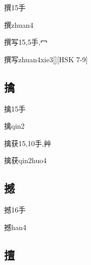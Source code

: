 \begin{Entry}{撰}{15}{⼿}
  \begin{Phonetics}{撰}{zhuan4}
  \end{Phonetics}
\end{Entry}

\begin{Entry}{撰写}{15,5}{⼿,⼍}
  \begin{Phonetics}{撰写}{zhuan4xie3}[][HSK 7-9]
  \end{Phonetics}
\end{Entry}

\subsection*{擒}

\begin{Entry}{擒}{15}{⼿}
  \begin{Phonetics}{擒}{qin2}
  \end{Phonetics}
\end{Entry}

\begin{Entry}{擒获}{15,10}{⼿,⾋}
  \begin{Phonetics}{擒获}{qin2huo4}
  \end{Phonetics}
\end{Entry}

\subsection*{撼}

\begin{Entry}{撼}{16}{⼿}
  \begin{Phonetics}{撼}{han4}
  \end{Phonetics}
\end{Entry}

\subsection*{擅}


